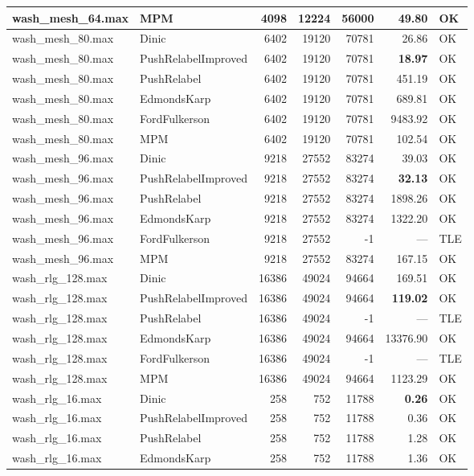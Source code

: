 \begin{longtable}{llrrrrl}
wash\_mesh\_64.max & MPM & 4098 & 12224 & 56000 & 49.80 & OK \\
\midrule
wash\_mesh\_80.max & Dinic & 6402 & 19120 & 70781 & 26.86 & OK \\
wash\_mesh\_80.max & PushRelabelImproved & 6402 & 19120 & 70781 & \textbf{18.97} & OK \\
wash\_mesh\_80.max & PushRelabel & 6402 & 19120 & 70781 & 451.19 & OK \\
wash\_mesh\_80.max & EdmondsKarp & 6402 & 19120 & 70781 & 689.81 & OK \\
wash\_mesh\_80.max & FordFulkerson & 6402 & 19120 & 70781 & 9483.92 & OK \\
wash\_mesh\_80.max & MPM & 6402 & 19120 & 70781 & 102.54 & OK \\
\midrule
wash\_mesh\_96.max & Dinic & 9218 & 27552 & 83274 & 39.03 & OK \\
wash\_mesh\_96.max & PushRelabelImproved & 9218 & 27552 & 83274 & \textbf{32.13} & OK \\
wash\_mesh\_96.max & PushRelabel & 9218 & 27552 & 83274 & 1898.26 & OK \\
wash\_mesh\_96.max & EdmondsKarp & 9218 & 27552 & 83274 & 1322.20 & OK \\
wash\_mesh\_96.max & FordFulkerson & 9218 & 27552 & -1 & --- & TLE \\
wash\_mesh\_96.max & MPM & 9218 & 27552 & 83274 & 167.15 & OK \\
\midrule
wash\_rlg\_128.max & Dinic & 16386 & 49024 & 94664 & 169.51 & OK \\
wash\_rlg\_128.max & PushRelabelImproved & 16386 & 49024 & 94664 & \textbf{119.02} & OK \\
wash\_rlg\_128.max & PushRelabel & 16386 & 49024 & -1 & --- & TLE \\
wash\_rlg\_128.max & EdmondsKarp & 16386 & 49024 & 94664 & 13376.90 & OK \\
wash\_rlg\_128.max & FordFulkerson & 16386 & 49024 & -1 & --- & TLE \\
wash\_rlg\_128.max & MPM & 16386 & 49024 & 94664 & 1123.29 & OK \\
\midrule
wash\_rlg\_16.max & Dinic & 258 & 752 & 11788 & \textbf{0.26} & OK \\
wash\_rlg\_16.max & PushRelabelImproved & 258 & 752 & 11788 & 0.36 & OK \\
wash\_rlg\_16.max & PushRelabel & 258 & 752 & 11788 & 1.28 & OK \\
wash\_rlg\_16.max & EdmondsKarp & 258 & 752 & 11788 & 1.36 & OK \\

\end{longtable}
